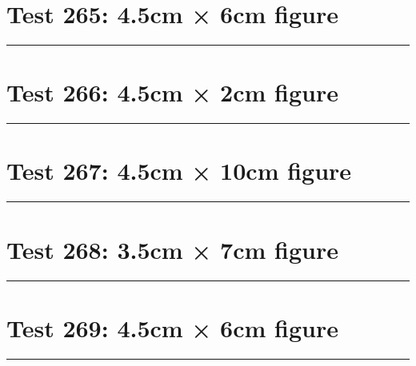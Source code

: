 \documentclass[a4paper,11pt]{article}
\begin{document}
\section*{Test 265: 4.5cm × 6cm figure}
\begin{swarmwrap}%
  \begin{minipage}[t]{4cm}
    \centering
    \rule{\linewidth}{6cm}
  \end{minipage}%
\end{swarmwrap}%
\swarmwrapnext
\lipsum[67]
\lipsum[68]
\lipsum[69]
\lipsum[70]
\lipsum[71]
\lipsum[72]
\section*{Test 266: 4.5cm × 2cm figure}
\begin{swarmwrap}%
  \begin{minipage}[t]{4cm}
    \centering
    \rule{\linewidth}{2cm}
  \end{minipage}%
\end{swarmwrap}%
\swarmwrapnext
\lipsum[75]
\lipsum[76]
\lipsum[77]
\lipsum[78]
\lipsum[79]
\lipsum[80]
\section*{Test 267: 4.5cm × 10cm figure}
\begin{swarmwrap}%
  \begin{minipage}[t]{4cm}
    \centering
    \rule{\linewidth}{10cm}
  \end{minipage}%
\end{swarmwrap}%
\swarmwrapnext
\lipsum[20]
\lipsum[21]
\lipsum[22]
\lipsum[23]
\section*{Test 268: 3.5cm × 7cm figure}
\begin{swarmwrap}%
  \begin{minipage}[t]{3cm}
    \centering
    \rule{\linewidth}{7cm}
  \end{minipage}%
\end{swarmwrap}%
\swarmwrapnext
\lipsum[110]
\lipsum[111]
\lipsum[112]
\lipsum[113]
\lipsum[114]
\section*{Test 269: 4.5cm × 6cm figure}
\begin{swarmwrap}%
  \begin{minipage}[t]{4cm}
    \centering
    \rule{\linewidth}{6cm}
  \end{minipage}%
\end{swarmwrap}%
\swarmwrapnext
\lipsum[79]
\lipsum[80]
\lipsum[81]
\lipsum[82]
\lipsum[83]
\lipsum[84]
\end{document}
